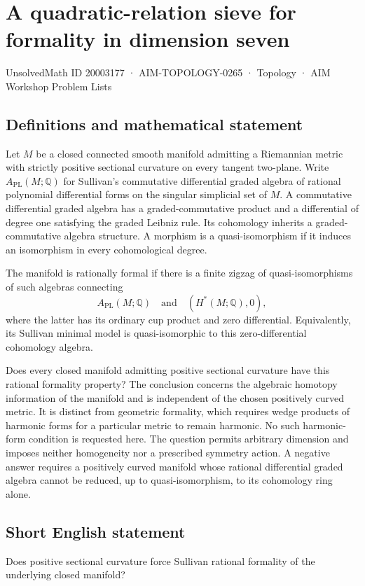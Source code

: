 \documentclass[11pt,a4paper]{article}
\begin{document}
\section*{A quadratic-relation sieve for formality in dimension seven}\label{20003177}
{\small UnsolvedMath ID 20003177 · AIM-TOPOLOGY-0265 · Topology · AIM Workshop Problem Lists}
\subsection{Definitions and mathematical statement}
Let $M$ be a closed connected smooth manifold admitting a Riemannian metric with strictly positive sectional curvature on every tangent two-plane.
Write $A_{\mathrm{PL}}(M;\mathbb Q)$ for Sullivan's commutative differential graded algebra of rational polynomial differential forms on the singular simplicial set of $M$.
A commutative differential graded algebra has a graded-commutative product and a differential of degree one satisfying the graded Leibniz rule.
Its cohomology inherits a graded-commutative algebra structure.
A morphism is a quasi-isomorphism if it induces an isomorphism in every cohomological degree.

The manifold is rationally formal if there is a finite zigzag of quasi-isomorphisms of such algebras connecting
\[
 A_{\mathrm{PL}}(M;\mathbb Q)
 \quad\text{and}\quad
 (H^*(M;\mathbb Q),0),
\]
where the latter has its ordinary cup product and zero differential.
Equivalently, its Sullivan minimal model is quasi-isomorphic to this zero-differential cohomology algebra.

Does every closed manifold admitting positive sectional curvature have this rational formality property?
The conclusion concerns the algebraic homotopy information of the manifold and is independent of the chosen positively curved metric.
It is distinct from geometric formality, which requires wedge products of harmonic forms for a particular metric to remain harmonic.
No such harmonic-form condition is requested here.
The question permits arbitrary dimension and imposes neither homogeneity nor a prescribed symmetry action.
A negative answer requires a positively curved manifold whose rational differential graded algebra cannot be reduced, up to quasi-isomorphism, to its cohomology ring alone.
\subsection{Short English statement}
Does positive sectional curvature force Sullivan rational formality of the underlying closed manifold?
\end{document}
